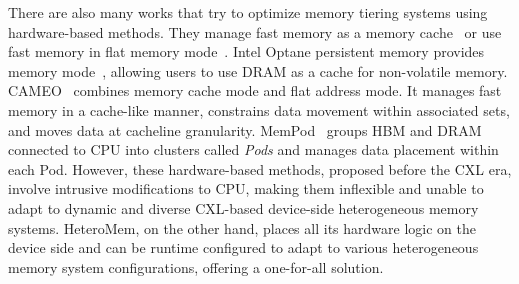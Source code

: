 
There are also many works that try to optimize memory tiering systems using hardware-based methods. They manage fast memory as a memory cache~\cite{optane_memory_mode} or use fast memory in flat memory mode~\cite{cameo_micro14, slic_fm_hpca17, chameleon_micro18, sehmm_sc10, mempod_hpca17, hopp}. Intel Optane persistent memory provides memory mode~\cite{optane_memory_mode}, allowing users to use DRAM as a cache for non-volatile memory.
CAMEO~\cite{cameo_micro14} combines memory cache mode and flat address mode. It manages fast memory in a cache-like manner, constrains data movement within associated sets, and moves data at cacheline granularity. MemPod~\cite{mempod_hpca17} groups HBM and DRAM connected to CPU into clusters called \emph{Pods} and manages data placement within each Pod.
However, these hardware-based methods, proposed before the CXL era, involve intrusive modifications to CPU, making them inflexible and unable to adapt to dynamic and diverse CXL-based device-side heterogeneous memory systems. 
HeteroMem, on the other hand, places all its hardware logic on the device side and can be runtime configured to adapt to various heterogeneous memory system configurations, offering a one-for-all solution.

